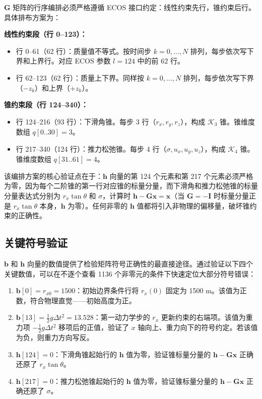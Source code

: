 $\bm{G}$ 矩阵的行序编排必须严格遵循 ECOS 接口约定：线性约束先行，锥约束后行。具体排布方案为：

\textbf{线性约束段（行 0--123）：}
\begin{itemize}
    \item 行 0--61（62 行）：质量值不等式。按时间步 $k = 0,\ldots,N$ 排列，每步依次写下界和上界行。对应 ECOS 参数 $l=124$ 中的前 62 行。
    \item 行 62--123（62 行）：质量上下界。同样按 $k = 0,\ldots,N$ 排列，每步依次写下界（$-z_k$）和上界（$+z_k$）。
\end{itemize}

\textbf{锥约束段（行 124--340）：}
\begin{itemize}
    \item 行 124--216（93 行）：下滑角锥。每步 3 行（$r_x, r_y, r_z$），构成 $\mathcal{K}_3$ 锥。锥维度数组 $q[0..30] = 3$。
    \item 行 217--340（124 行）：推力松弛锥。每步 4 行（$\sigma, u_x, u_y, u_z$），构成 $\mathcal{K}_4$ 锥。锥维度数组 $q[31..61] = 4$。
\end{itemize}

该编排方案的核心验证点在于：$\bm{h}$ 向量的第 124 个元素和第 217 个元素必须严格为零，因为每个二阶锥的第一行对应锥的标量分量，而下滑角和推力松弛锥的标量分量表达式分别为 $r_x\tan\theta$ 和 $\sigma$，计算时 $\bm{h} - \bm{G}\bm{x} = \bm{x}$（当 $\bm{G} = -\bm{I}$ 时标量分量正是 $r_x\tan\theta$ 本身，$\bm{h}$ 为零）。任何非零的 $\bm{h}$ 值都将引入非物理的偏移量，破坏锥约束的正确性。

\subsection{关键符号验证}

$\bm{b}$ 和 $\bm{h}$ 向量的数值提供了检验矩阵符号正确性的最直接途径。通过验证以下四个关键数值，可以在不逐个查看 1136 个非零元的条件下快速定位大部分符号错误：

\begin{enumerate}
    \item $\bm{b}[0] = r_{x0} = 1500$：初始边界条件行将 $r_x(0)$ 固定为 1500 m。该值为正数，符合物理直觉——初始高度为正。
    \item $\bm{b}[13] = \frac{1}{2}g\Delta t^2 = 13.528$：第一动力学步的 $r_x$ 更新约束的右端项。该值为重力项 $-\frac{1}{2}g\Delta t^2$ 移项后的正值，验证了 $x$ 轴向上、重力向下的符号约定。若该值为负，则重力方向写反。
    \item $\bm{h}[124] = 0$：下滑角锥起始行的 $\bm{h}$ 值为零，验证锥标量分量的 $\bm{h} - \bm{G}\bm{x}$ 正确还原了 $r_x\tan\theta$。
    \item $\bm{h}[217] = 0$：推力松弛锥起始行的 $\bm{h}$ 值为零，验证锥标量分量的 $\bm{h} - \bm{G}\bm{x}$ 正确还原了 $\sigma$。
\end{enumerate}

